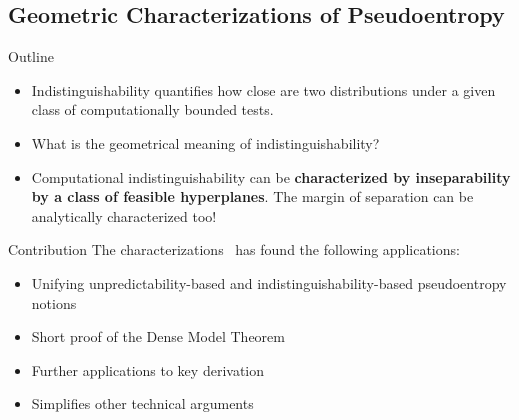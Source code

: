 \documentclass[9pt]{beamer}					%
\begin{document}
\subsection{Geometric Characterizations of Pseudoentropy }

\begin{frame}{Outline}
\begin{itemize}
\item[\emoji{open-book}] Indistinguishability quantifies how close are two distributions under a given class of computationally bounded tests. 
\item[\emoji{question}] What is the geometrical meaning of indistinguishability?
\item[\emoji{raised-hand}] Computational indistinguishability can be \textbf{characterized by inseparability by a class of feasible hyperplanes}. The margin of separation can be analytically characterized too! 
\end{itemize}
\end{frame}

\begin{frame}{Contribution}
The characterizations~\cite{DBLP:conf/icits/Skorski15} has found the following applications:
\begin{itemize}
    \item[\emoji{key}] Unifying unpredictability-based and indistinguishability-based pseudoentropy notions~\cite{DBLP:conf/icalp/SkorskiGP15}
    \item[\emoji{key}] Short proof of the Dense Model Theorem~\cite{DBLP:conf/icits/Skorski15a}
    \item[\emoji{key}] Further applications to key derivation~\cite{Skorski17a}
    \item[\emoji{key}] Simplifies other technical arguments~\cite{DBLP:conf/stoc/VadhanZ12}
\end{itemize}
\end{frame}
\end{document}
